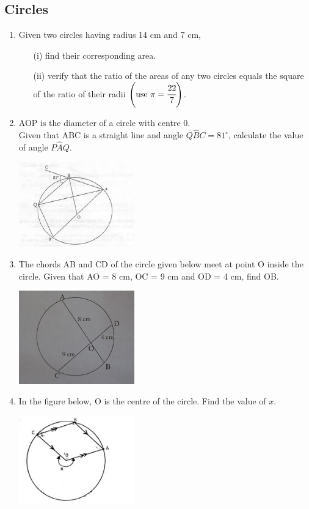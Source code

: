 	\subsection{Circles}
\begin{enumerate}
	\item Given two circles having radius 14 cm and 7 cm,
		\begin{itemize}
		\item[(i)] find their corresponding area.
		\item[(ii)] verify that the ratio of the areas of any two circles equals the square of the ratio of their radii $\left(\text{use }\pi = \cfrac{22}{7}\right)$.
		\end{itemize}
		
	\item AOP is the diameter of a circle with centre 0.\\
	Given that ABC is a straight line and angle $Q\hat{B}C = 81^\circ$, calculate the value of angle $P\hat{A}Q$.
	\begin{center}
	\includegraphics[width=5cm]{./img/circ1.jpg}
	\end{center}	
	
	\item The chords AB and CD of the circle given below meet at point O inside the circle. Given that AO = 8 cm, OC = 9 cm and OD = 4 cm, find OB.
	\begin{center}
	\includegraphics[width=5cm]{./img/circ19.jpg}
	\end{center}		

	\item In the figure below, O is the centre of the circle. Find the value of $x$.
	\begin{center}
	\includegraphics[width=5cm]{./img/circ2.jpg}
	\end{center}


\end{enumerate}
